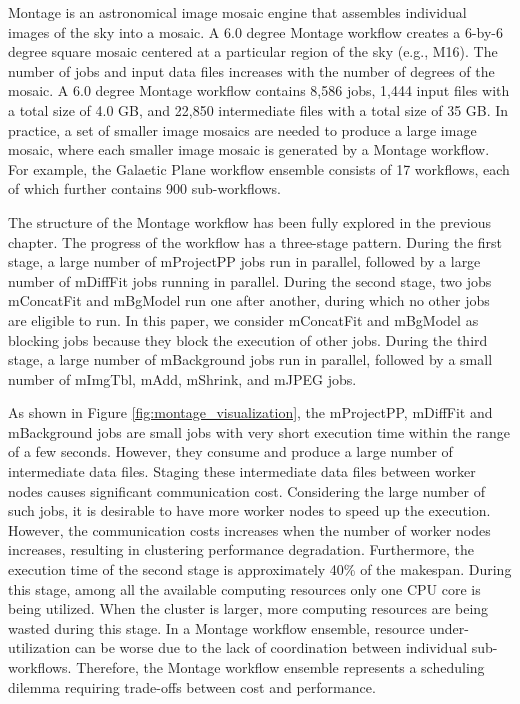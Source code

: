 Montage is an astronomical image mosaic engine that assembles individual images of the sky into a mosaic. A 6.0 degree Montage workflow creates a 6-by-6 degree square mosaic centered at a particular region of the sky (e.g., M16). The number of jobs and input data files increases with the number of degrees of the mosaic. A 6.0 degree Montage workflow contains 8,586 jobs, 1,444 input files with a total size of 4.0 GB, and 22,850 intermediate files with a total size of 35 GB. In practice, a set of smaller image mosaics are needed to produce a large image mosaic, where each smaller image mosaic is generated by a Montage workflow. For example, the Galaetic Plane workflow ensemble \cite{deelman2013hosted} consists of 17 workflows, each of which further contains 900 sub-workflows. 


The structure of the Montage workflow has been fully explored in the previous chapter. The progress of the workflow has a three-stage pattern. During the first stage, a large number of mProjectPP jobs run in parallel, followed by a large number of mDiffFit jobs running in parallel. During the second stage, two jobs mConcatFit and mBgModel run one after another, during which no other jobs are eligible to run. In this paper, we consider mConcatFit and mBgModel as blocking jobs because they block the execution of other jobs. During the third stage, a large number of mBackground jobs run in parallel, followed by a small number of mImgTbl, mAdd, mShrink, and mJPEG jobs.

As shown in Figure  \ref{fig:montage_visualization}, the mProjectPP, mDiffFit and mBackground jobs are small jobs with very short execution time within the range of a few seconds. However, they consume and produce a large number of intermediate data files. Staging these intermediate data files between worker nodes causes significant communication cost. Considering the large number of such jobs, it is desirable to have more worker nodes to speed up the execution. However, the communication costs increases when the number of worker nodes increases, resulting in clustering performance degradation. Furthermore, the execution time of the second stage is approximately 40\% of the makespan. During this stage, among all the available computing resources only one CPU core is being utilized. When the cluster is larger, more computing resources are being wasted during this stage. In a Montage workflow ensemble, resource under-utilization can be worse due to the lack of coordination between individual sub-workflows. Therefore, the Montage workflow ensemble represents a scheduling dilemma requiring trade-offs between cost and performance. 


